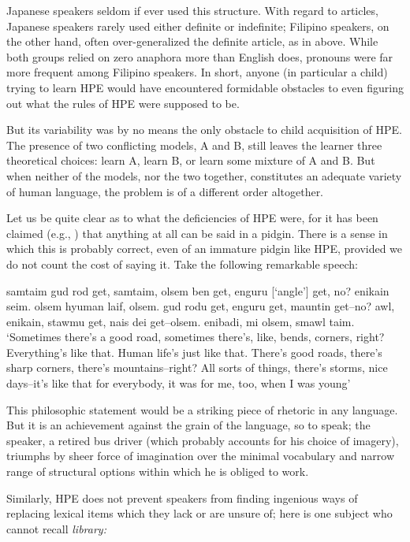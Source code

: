 \noindent Japanese speakers seldom if ever used this structure. With regard to articles, Japanese speakers rarely used either definite or indefinite; Filipino speakers, on the other hand, often over-generalized the definite article, as in  above. While both groups relied on zero anaphora more than English does, pronouns were far more frequent among Filipino speakers. In short, anyone (in particular a child) trying to learn HPE would have encountered formidable obstacles to even figuring out what the rules of HPE were supposed to be.

But its variability was by no means the only obstacle to child acquisition of HPE. The presence of two conflicting models, A and B, still leaves the learner three theoretical choices: learn A, learn B, or learn some mixture of A and B. But when neither of the models, nor the two together, constitutes an adequate variety of human language, the problem is of a different order altogether.

Let us be quite clear as to what the deficiencies of HPE were, for it has been claimed (e.g., \citealt{Samarin1971}) that anything at all can be said in a pidgin. There is a sense in which this is probably correct, even of an immature pidgin like HPE, provided we do not count the cost of saying it. Take the following remarkable speech:

\ea\label{ex:12}
 samtaim gud rod get, samtaim, olsem ben get, enguru [`angle'] get, no? enikain seim. olsem hyuman laif, olsem. gud rodu get, enguru get, mauntin get--no? awl, enikain, stawmu get, nais dei get--olsem. enibadi, mi olsem, smawl taim.
\glt  `Sometimes there's a good road, sometimes there's, like, bends, corners, right? Everything's like that. Human life's just like that. There's good roads, there's sharp corners, there's mountains--right? All sorts of things, there's storms, nice days--it's like that for everybody, it was for me, too, when I was young'
\z

\noindent This philosophic statement would be a striking piece of rhetoric in any language. But it is an achievement against the grain of the language, so to speak; the speaker, a retired bus driver (which probably accounts for his choice of imagery), triumphs by sheer force of imagination over
the minimal vocabulary and narrow range of structural options within which he is obliged to work.

Similarly, HPE does not prevent speakers from finding ingenious ways of replacing lexical items which they lack or are unsure of; here is one subject who cannot recall \textit{library:}

